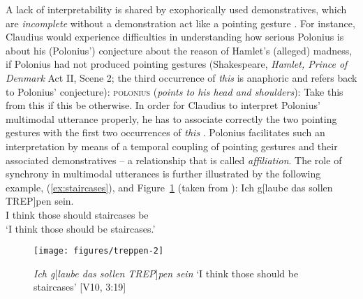 \documentclass[output=paper
 	        ,biblatex
                ,babelshorthands
                ,newtxmath
                ,draftmode
                ,colorlinks, citecolor=brown
]{langscibook}
\begin{document}
%
%
A lack of interpretability is shared by exophorically used demonstratives, which are \emph{incomplete} without a demonstration act like a pointing gesture \citep[]{Kaplan:1989:a}.
%
For instance, Claudius would experience difficulties in understanding how serious Polonius is about his (Polonius') conjecture about the reason of Hamlet's (alleged) madness, if Polonius had not produced pointing gestures (Shakespeare, \textit{Hamlet, Prince of Denmark} Act II, Scene 2; the third occurrence of \textit{this} is anaphoric and refers back to Polonius' conjecture):
%
\ea \label{ex:this}
\textsc{polonius} (\textit{points to his head and shoulders}): 
Take this from this if this be otherwise.
\z
%
In order for Claudius to interpret Polonius' multimodal utterance properly, he has to associate correctly the two pointing gestures with the first two occurrences of \textit{this} \citep[cf.][]{Kupffer:2014}. 
%
Polonius facilitates such an interpretation by means of a temporal coupling of pointing gestures and their associated demonstratives -- a relationship that is called \emph{affiliation}.
%
The role of synchrony in multimodal utterances is further illustrated by the following example, (\ref{ex:staircases}), and Figure~\ref{fig:staircases} (taken from \citealp[]{Luecking:2013:a}):
%
\ea \label{ex:staircases}
\gll Ich g[laube das sollen TREP]pen sein.\\
     I think those should staircases be \\
\glt \enquote*{I think those should be staircases.}
\z

\begin{figure}[tb]
  \texttt{[image: figures/treppen-2]}
  \caption[Staircases]{\textit{Ich g}[\textit{laube das sollen TREP}]\textit{pen sein} \enquote*{I think those should be staircases} [V10, 3:19]}
  \label{fig:staircases}
\end{figure}
\end{document}
